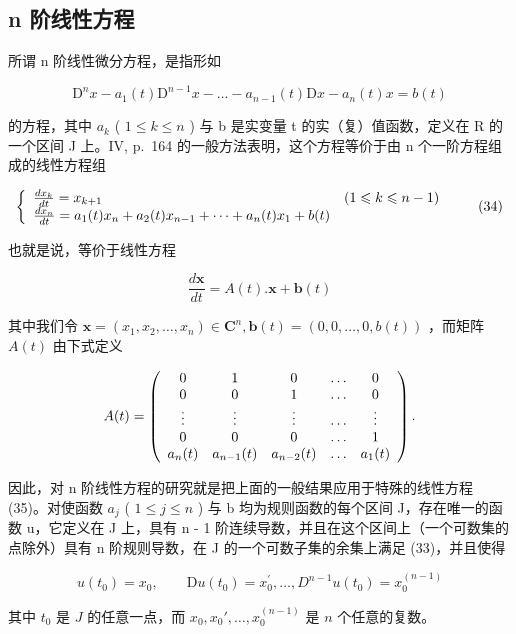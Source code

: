 \subsection{n 阶线性方程}

所谓 n 阶线性微分方程，是指形如

\[
\mathrm{D} ^ {n} x - a _ {1} (t) \mathrm{D} ^ {n - 1} x - \dots - a _ {n - 1} (t) \mathrm{D} x - a _ {n} (t) x = b (t)\tag{33}
\]

的方程，其中 \(a_{k}\) ( \(1 \leqslant k \leqslant n\) ) 与 b 是实变量 t 的实（复）值函数，定义在 R 的一个区间 J 上。IV, p.~164 的一般方法表明，这个方程等价于由 n 个一阶方程组成的线性方程组

\[
\left\{ \begin{array}{l l} \frac {d x _ {k}}{d t} = x _ {k + 1} & (1 \leqslant k \leqslant n - 1) \\ \frac {d x _ {n}}{d t} = a _ {1} (t) x _ {n} + a _ {2} (t) x _ {n - 1} + \dots + a _ {n} (t) x _ {1} + b (t) \end{array} \right.\tag{34}
\]

也就是说，等价于线性方程

\[
\frac {d \mathbf {x}}{d t} = A (t). \mathbf {x} + \mathbf {b} (t)\tag{35}
\]

其中我们令 \(\mathbf{x}=(x_{1},x_{2},\ldots,x_{n})\in\mathbf{C}^{n},\mathbf{b}(t)=(0,0,\ldots,0,b(t))\) ，而矩阵 \(A(t)\) 由下式定义

\[
A (t) = \left( \begin{array}{c c c c c} 0 & 1 & 0 & \ldots & 0 \\ 0 & 0 & 1 & \ldots & 0 \\ \vdots & \vdots & \vdots & \ldots & \vdots \\ 0 & 0 & 0 & \ldots & 1 \\ a _ {n} (t) & a _ {n - 1} (t) & a _ {n - 2} (t) & \ldots & a _ {1} (t) \end{array} \right).
\]

因此，对 n 阶线性方程的研究就是把上面的一般结果应用于特殊的线性方程 (35)。对使函数 \(a_{j}\) ( \(1 \leqslant j \leqslant n\) ) 与 b 均为规则函数的每个区间 J，存在唯一的函数 u，它定义在 J 上，具有 n - 1 阶连续导数，并且在这个区间上（一个可数集的点除外）具有 n 阶规则导数，在 J 的一个可数子集的余集上满足 (33)，并且使得

\[
u (t _ {0}) = x _ {0}, \qquad \mathrm{D} u (t _ {0}) = x _ {0} ^ {\prime}, \dots , D ^ {n - 1} u (t _ {0}) = x _ {0} ^ {(n - 1)}\tag{36}
\]

其中 \(t_0\) 是 \(J\) 的任意一点，而 \(x_0, x_0', \ldots, x_0^{(n-1)}\) 是 \(n\) 个任意的复数。

